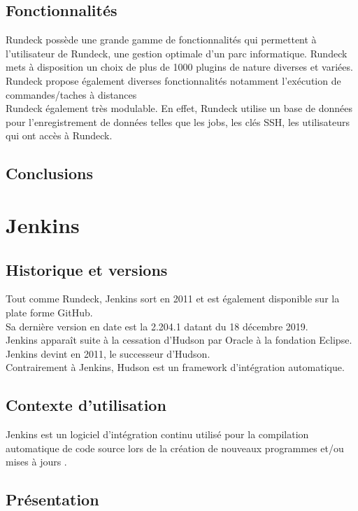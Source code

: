 \documentclass[12pt]{article}
\begin{document}
\subsection{Fonctionnalités}

Rundeck possède une grande gamme de fonctionnalités qui permettent à l'utilisateur de Rundeck, une gestion optimale d'un parc informatique. Rundeck mets à disposition un choix de plus de 1000 plugins de nature diverses et variées. 
\\
Rundeck propose également diverses fonctionnalités notamment l'exécution de commandes/taches à distances
\\
Rundeck également très modulable. En effet, Rundeck utilise un base de données pour l'enregistrement de données telles que les jobs, les clés SSH, les utilisateurs qui ont accès à Rundeck.

\subsection{Conclusions}

\section{Jenkins}
\subsection{Historique et versions}

Tout comme Rundeck, Jenkins sort en 2011 et est également disponible sur la plate forme GitHub.
\\
Sa dernière version en date est la 2.204.1 datant du 18 décembre 2019.
\\
Jenkins apparaît suite à la cessation d'Hudson par Oracle à la fondation Eclipse. Jenkins devint en 2011, le successeur d'Hudson.
\\
Contrairement à Jenkins, Hudson est un framework d'intégration automatique.

\subsection{Contexte d'utilisation}

Jenkins est un logiciel d'intégration continu utilisé pour la compilation automatique de code source lors de la création de nouveaux programmes et/ou mises à jours .

\subsection{Présentation}
\end{document}
